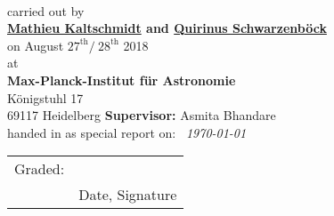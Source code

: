 
\begin{titlepage}
	\begin{center}
		\makeatletter
		
		\thispagestyle{empty}
		
		\huge\textbf{\@title} \\
		\vfill
		\large carried out by \\
		\Large\textbf{\href{mailto: M.Kaltschmidt@stud.uni-heidelberg.de}{Mathieu Kaltschmidt} and 
			\href{mailto:Schwarzenboeck@stud.uni-heideberg.de}{Quirinus Schwarzenböck}} \\
		\vspace{2mm}
		\large{on August $27^{\text{th}} / \ 28^{\text{th}}$} 2018 \\
		\vfill 
		\large{at} \\
		\Large\textbf{Max-Planck-Institut für Astronomie} \\
				\vspace{2mm}
		\large Königstuhl 17\\
		69117 Heidelberg
		\vfill
		\Large
		\textbf{Supervisor:} Asmita Bhandare \\
		\vfill
	   handed in as special report on: \  \textit{\today} \\
	   \vfill
	   
	   \begin{tabular}{@{}p{.5in}p{4in}@{}}
			\vspace{-15pt}Graded: & \hspace{8pt}\hrulefill \\
			& \vspace{-13pt}\hspace{10pt}\normalsize Date, Signature \\
	   \end{tabular}
		\makeatother
	\end{center}
\blankpage
\end{titlepage}
